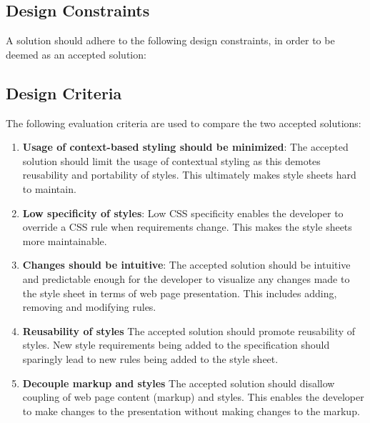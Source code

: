 \documentclass[12pt]{article}
\begin{document}





\subsection{Design Constraints}
A solution should adhere to the following design constraints, in order to be deemed as an accepted solution:


\subsection{Design Criteria}
The following evaluation criteria are used to compare the two accepted solutions:
\begin{enumerate}

	\item \textbf{Usage of context-based styling should be minimized}: The accepted solution should limit the usage of contextual styling as this demotes reusability and portability of styles. This ultimately makes style sheets hard to maintain.

	\item \textbf{Low specificity of styles}: Low CSS specificity enables the developer to override a CSS rule when requirements change. This makes the style sheets more maintainable.

	\item \textbf{Changes should be intuitive}: The accepted solution should be intuitive and predictable enough for the developer to visualize any changes made to the style sheet in terms of web page presentation. This includes adding, removing and modifying rules.

	\item \textbf{Reusability of styles} The accepted solution should promote reusability of styles. New style requirements being added to the specification should sparingly lead to new rules being added to the style sheet.

	\item \textbf{Decouple markup and styles} The accepted solution should disallow coupling of web page content (markup) and styles. This enables the developer to make changes to the presentation without making changes to the markup.

\end{enumerate}
\end{document}
